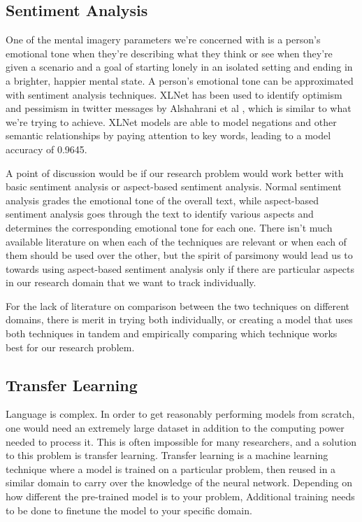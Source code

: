 \documentclass[12pt, a4paper]{article}
\begin{document}
\subsection{Sentiment Analysis}
One of the mental imagery parameters we're concerned with is a person's emotional tone when they're describing what they think or see when they're given a scenario and a goal of starting lonely in an isolated setting and ending in a brighter, happier mental state. A person's emotional tone can be approximated with sentiment analysis techniques. XLNet has been used to identify optimism and pessimism in twitter messages by Alshahrani et al \cite{alshahrani2019xlnet}, which is similar to what we're trying to achieve. XLNet models are able to model negations and other semantic relationships by paying attention to key words, leading to a model accuracy of 0.9645. 

A point of discussion would be if our research problem would work better with basic sentiment analysis or aspect-based sentiment analysis. Normal sentiment analysis grades the emotional tone of the overall text, while aspect-based sentiment analysis goes through the text to identify various aspects and determines the corresponding emotional tone for each one. There isn't much available literature on when each of the techniques are relevant or when each of them should be used over the other, but the spirit of parsimony would lead us to towards using aspect-based sentiment analysis only if there are particular aspects in our research domain that we want to track individually. 

For the lack of literature on comparison between the two techniques on different domains, there is merit in trying both individually, or creating a model that uses both techniques in tandem and empirically comparing which technique works best for our research problem.

\subsection{Transfer Learning}
Language is complex. In order to get reasonably performing models from scratch, one would need an extremely large dataset in addition to the computing power needed to process it. This is often impossible for many researchers, and a solution to this problem is transfer learning. Transfer learning is a machine learning technique where a model is trained on a particular problem, then reused in a similar domain to carry over the knowledge of the neural network. Depending on how different the pre-trained model is to your problem, Additional training needs to be done to finetune the model to your specific domain. \cite{ruder2019transfer}
\end{document}

